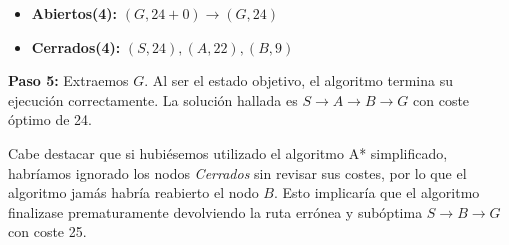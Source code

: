 \documentclass[11pt, a4paper]{article}
\newenvironment{problem}[1][Cuestión]{
	\vspace{0.5cm}
	\noindent{\Large\bfseries #1} \par\vspace{0.5cm}
}{
	\vspace{0.5cm}
}
\begin{document}
\begin{problem}[Cuestión 1 (20\%)]
{			\begin{itemize}
				\item \textbf{Abiertos(4):} $(G,24+0) \to (G,24)$
				\item \textbf{Cerrados(4):} $(S,24),(A,22),(B,9)$
			\end{itemize}

			\textbf{Paso 5:} Extraemos $G$. Al ser el estado objetivo, el algoritmo termina su ejecución correctamente. La solución hallada es $S \to A \to B \to G$ con coste óptimo de 24.

			Cabe destacar que si hubiésemos utilizado el algoritmo A* simplificado, habríamos ignorado los nodos \textit{Cerrados} sin revisar sus costes, por lo que el algoritmo jamás habría reabierto el nodo $B$. Esto implicaría que el algoritmo finalizase prematuramente devolviendo la ruta errónea y subóptima $S \to B \to G$ con coste 25.
		}

			\vspace{0.5cm}
		\end{problem}
\end{document}
